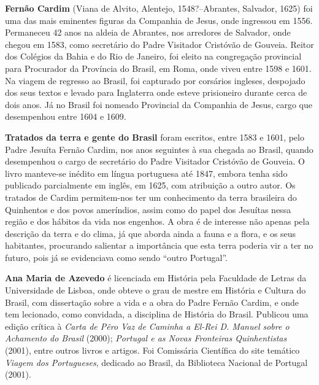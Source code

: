 

\textbf{Fernão Cardim} (Viana de Alvito, Alentejo, 1548?--Abrantes, Salvador, 1625) foi uma das mais eminentes figuras da 
Companhia de Jesus, onde ingressou em 1556. Permaneceu 42 anos na aldeia de Abrantes, nos arredores de Salvador,
onde chegou em 1583, como secretário do Padre Visitador Cristóvão de Gouveia. Reitor dos Colégios da Bahia e do Rio de Janeiro, 
foi eleito na congregação provincial para Procurador da Província do Brasil, em Roma, onde viveu entre 1598 e 1601. 
Na viagem de regresso ao Brasil, foi 
capturado por corsários ingleses, despojado dos seus textos e levado para Inglaterra onde esteve prisioneiro 
durante cerca de dois anos. Já no Brasil foi nomeado Provincial da Companhia de Jesus, cargo que 
desempenhou entre 1604 e 1609. 

\textbf{Tratados da terra e gente do Brasil} foram escritos, entre 1583 e 1601, 
pelo Padre Jesuíta Fernão Cardim, nos anos seguintes à sua chegada ao Brasil, 
quando desempenhou o cargo de secretário do Padre Visitador Cristóvão de Gouveia. O livro manteve-se inédito 
em língua portuguesa até 1847, embora tenha sido publicado parcialmente em inglês, em 1625, com atribuição
a outro autor. 
Os tratados de Cardim permitem-nos ter um conhecimento da terra brasileira 
do Quinhentos e dos povos ameríndios, assim como do papel dos Jesuítas nessa região e dos hábitos da vida nos engenhos. 
A obra é de interesse não apenas pela descrição da terra e do clima, já que aborda ainda a fauna e a flora, e os seus 
habitantes, procurando salientar a importância que esta terra poderia vir a ter no futuro, pois já se evidenciava como 
sendo ``outro Portugal''. 

\textbf{Ana Maria de Azevedo} é licenciada em História pela Faculdade de Letras da Universidade de Lisboa, 
onde obteve o grau de mestre em História e Cultura do Brasil, com dissertação sobre a vida e a obra 
do Padre Fernão Cardim, e onde tem lecionado, como convidada, a disciplina de História do Brasil. 
Publicou uma edição crítica à \textit{Carta de Pêro Vaz de Caminha 
a El-Rei D. Manuel sobre o Achamento do Brasil} (2000); \textit{Portugal e as Novas Fronteiras Quinhentistas} 
(2001), entre outros livros e artigos. Foi Comissária Científica do site temático \textit{Viagem dos Portugueses}, 
dedicado ao Brasil, da Biblioteca Nacional de Portugal (2001).


